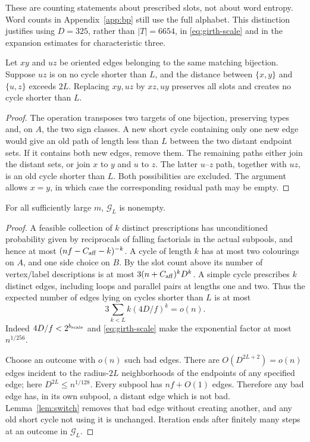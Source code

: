 These are counting statements about prescribed slots, not about word entropy. Word counts in Appendix~\ref{app:bp} still use the full alphabet. This distinction justifies using $D=325$, rather than $|T|=6654$, in \eqref{eq:girth-scale} and in the expansion estimates for characteristic three.

\begin{lemma}\label{lem:switch}
Let $xy$ and $uz$ be oriented edges belonging to the same matching bijection. Suppose $uz$ is on no cycle shorter than $L$, and the distance between $\{x,y\}$ and $\{u,z\}$ exceeds $2L$. Replacing $xy,uz$ by $xz,uy$ preserves all slots and creates no cycle shorter than $L$.
\end{lemma}
\begin{proof}
The operation transposes two targets of one bijection, preserving types and, on $A$, the two sign classes. A new short cycle containing only one new edge would give an old path of length less than $L$ between the two distant endpoint sets. If it contains both new edges, remove them. The remaining paths either join the distant sets, or join $x$ to $y$ and $u$ to $z$. The latter $u$--$z$ path, together with $uz$, is an old cycle shorter than $L$. Both possibilities are excluded. The argument allows $x=y$, in which case the corresponding residual path may be empty.
\end{proof}

\begin{proposition}\label{prop:girth}
For all sufficiently large $m$, $\mathcal G_L$ is nonempty.
\end{proposition}
\begin{proof}
A feasible collection of $k$ distinct prescriptions has unconditioned probability given by reciprocals of falling factorials in the actual subpools, and hence at most $(nf-C_{\rm aff}-k)^{-k}$. A cycle of length $k$ has at most two colourings on $A$, and one side choice on $B$. By the slot count above its number of vertex/label descriptions is at most $3(n+C_{\rm aff})^kD^k$. A simple cycle prescribes $k$ distinct edges, including loops and parallel pairs at lengths one and two. Thus the expected number of edges lying on cycles shorter than $L$ is at most
\[
 3\sum_{k<L}k(4D/f)^k=o(n).
\]
Indeed $4D/f<2^{b_{\rm scale}}$ and \eqref{eq:girth-scale} make the exponential factor at most $n^{1/256}$.

Choose an outcome with $o(n)$ such bad edges. There are $O(D^{2L+2})=o(n)$ edges incident to the radius-$2L$ neighborhoods of the endpoints of any specified edge; here $D^{2L}\le n^{1/128}$. Every subpool has $nf+O(1)$ edges. Therefore any bad edge has, in its own subpool, a distant edge which is not bad. Lemma~\ref{lem:switch} removes that bad edge without creating another, and any old short cycle not using it is unchanged. Iteration ends after finitely many steps at an outcome in $\mathcal G_L$.
\end{proof}

